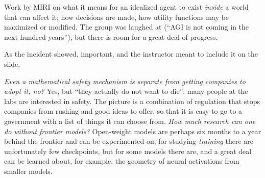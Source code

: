 \begin{description}[style=nextline, leftmargin=0pt]
  \item[Agent foundations.] Work by MIRI on what it means for an idealized agent to exist \emph{inside} a world that can affect it; how decisions are made, how utility functions may be maximized or modified. The group was laughed at (``AGI is not coming in the next hundred years''), but there is room for a great deal of progress.
  \item[Game theory of agent--agent interaction.] As the incident showed, important, and the instructor meant to include it on the slide.
\end{description}

\begin{discussion}
\emph{Even a mathematical safety mechanism is separate from getting companies to adopt it, no?} Yes, but ``they actually do not want to die'': many people at the labs are interested in safety. The picture is a combination of regulation that stops companies from rushing and good ideas to offer, so that it is easy
to go to a government with a list of things it can choose from. \emph{How much research can one do without frontier models?} Open-weight models are perhaps six months to a year behind the frontier and can be experimented on; for studying \emph{training} there are unfortunately few checkpoints, but for some models there are, and a great deal can be learned about, for example, the geometry of neural activations from smaller models.
\end{discussion}


